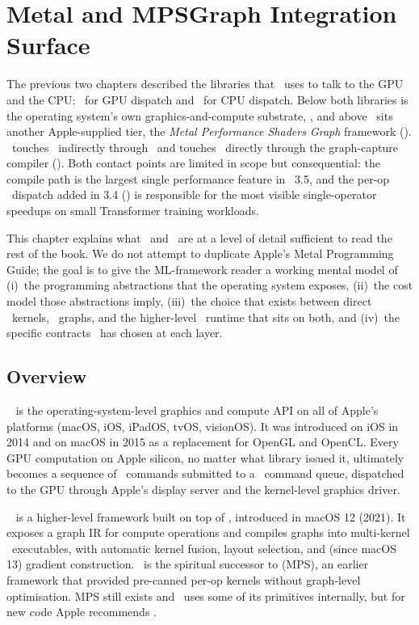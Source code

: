 \chapter{Metal and MPSGraph Integration Surface}
\label{ch:metal_mpsgraph}

The previous two chapters described the libraries that \Lucid\ uses
to talk to the GPU and the CPU: \MLX\ for GPU dispatch and
\Accelerate\ for CPU dispatch. Below both libraries is the operating
system's own graphics-and-compute substrate, \Metal, and above
\Metal\ sits another Apple-supplied tier, the \emph{Metal Performance
Shaders Graph} framework (\MPSGraph). \Lucid\ touches \Metal\
indirectly through \MLX\ and touches \MPSGraph\ directly through the
graph-capture compiler (\chref{ch:compile_design}). Both contact
points are limited in scope but consequential: the compile path is
the largest single performance feature in \Lucid\ 3.5, and the
per-op \MPSGraph\ dispatch added in 3.4
() is responsible for the most visible
single-operator speedups on small Transformer training workloads.

This chapter explains what \Metal\ and \MPSGraph\ are at a level of
detail sufficient to read the rest of the book. We do not attempt to
duplicate Apple's Metal Programming Guide; the goal is to give the
ML-framework reader a working mental model of (i)~the programming
abstractions that the operating system exposes, (ii)~the cost model
those abstractions imply, (iii)~the choice that exists between
direct \Metal\ kernels, \MPSGraph\ graphs, and the higher-level
\MLX\ runtime that sits on both, and (iv)~the specific contracts
\Lucid\ has chosen at each layer.

\section{Overview}
\label{sec:metal_mpsgraph:overview}

\Metal\ \cite{apple_metal_programming} is the operating-system-level
graphics and compute API on all of Apple's platforms (macOS, iOS,
iPadOS, tvOS, visionOS). It was introduced on iOS in 2014 and on
macOS in 2015 as a replacement for OpenGL and OpenCL. Every GPU computation on Apple silicon, no
matter what library issued it, ultimately becomes a sequence of
\Metal\ commands submitted to a \Metal\ command queue, dispatched
to the GPU through Apple's display server and the kernel-level
graphics driver.

\MPSGraph\ \cite{apple_mpsgraph} is a higher-level framework built
on top of \Metal, introduced in macOS 12 (2021). It exposes a graph IR for compute
operations and compiles graphs into multi-kernel \Metal\ executables,
with automatic kernel fusion, layout selection, and (since macOS 13)
gradient construction. \MPSGraph\ is the spiritual successor to
 (MPS), an earlier framework that
provided pre-canned per-op kernels without graph-level optimisation.
MPS still exists and \MPSGraph\ uses some of its primitives
internally, but for new code Apple recommends \MPSGraph.

